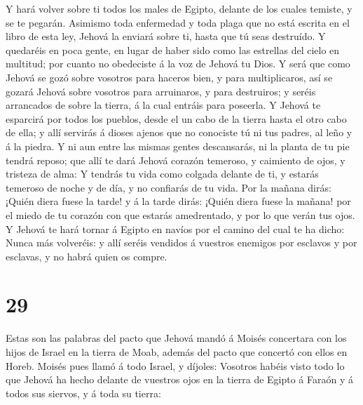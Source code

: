  Y hará volver sobre ti todos los males de Egipto, delante
de los cuales temiste, y se te pegarán.  Asimismo toda
enfermedad y toda plaga que no está escrita en el libro de esta ley,
Jehová la enviará sobre ti, hasta que tú seas destruído.  Y
quedaréis en poca gente, en lugar de haber sido como las estrellas del
cielo en multitud; por cuanto no obedeciste á la voz de Jehová tu Dios.
 Y será que como Jehová se gozó sobre vosotros para haceros
bien, y para multiplicaros, así se gozará Jehová sobre vosotros para
arruinaros, y para destruiros; y seréis arrancados de sobre la tierra, á
la cual entráis para poseerla.  Y Jehová te esparcirá por
todos los pueblos, desde el un cabo de la tierra hasta el otro cabo de
ella; y allí servirás á dioses ajenos que no conociste tú ni tus padres,
al leño y á la piedra.  Y ni aun entre las mismas gentes
descansarás, ni la planta de tu pie tendrá reposo; que allí te dará
Jehová corazón temeroso, y caimiento de ojos, y tristeza de alma:
 Y tendrás tu vida como colgada delante de ti, y estarás
temeroso de noche y de día, y no confiarás de tu vida.  Por
la mañana dirás: ¡Quién diera fuese la tarde! y á la tarde dirás: ¡Quién
diera fuese la mañana! por el miedo de tu corazón con que estarás
amedrentado, y por lo que verán tus ojos.  Y Jehová te hará
tornar á Egipto en navíos por el camino del cual te ha dicho: Nunca más
volveréis: y allí seréis vendidos á vuestros enemigos por esclavos y por
esclavas, y no habrá quien os compre.

\hypertarget{section-28}{%
\section{29}\label{section-28}}

 Estas son las palabras del pacto que Jehová mandó á Moisés
concertara con los hijos de Israel en la tierra de Moab, además del
pacto que concertó con ellos en Horeb.  Moisés pues llamó á
todo Israel, y díjoles: Vosotros habéis visto todo lo que Jehová ha
hecho delante de vuestros ojos en la tierra de Egipto á Faraón y á todos
sus siervos, y á toda su tierra:

